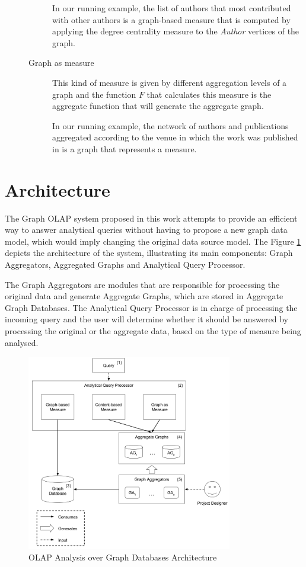 \begin{description}
\begin{description}
In our running example, the list of authors that most contributed with other authors is a graph-based measure that is computed by applying the degree centrality measure to the \emph{Author} vertices of the graph.
\item[Graph as measure] This kind of measure is given by different aggregation levels of a graph and the function $F$ that calculates this measure is the aggregate function that will generate the aggregate graph.

In our running example, the network of authors and  publications aggregated according to the venue in which the work was published in is a graph that represents a measure.
\end{description}
\end{description}

\section{Architecture}

The Graph OLAP system proposed in this work attempts to provide an efficient way to answer analytical queries without having to propose a new graph data model, which would imply changing the original data source model. The Figure \ref{fig:figure27} depicts the architecture of the system, illustrating its main components: Graph Aggregators, Aggregated Graphs and Analytical Query Processor.

The Graph Aggregators are modules that are responsible for processing the original data and generate Aggregate Graphs, which are stored in Aggregate Graph Databases. The Analytical Query Processor is in charge of processing the incoming query and the user will determine whether it should be answered by processing the original or the aggregate data, based on the type of measure being analysed.

\begin{figure}[ht]
\centering
\caption{OLAP Analysis over Graph Databases Architecture}
\label{fig:figure27}
\includegraphics[width=0.8\textwidth]{images/Architecture.png}
\end{figure}


